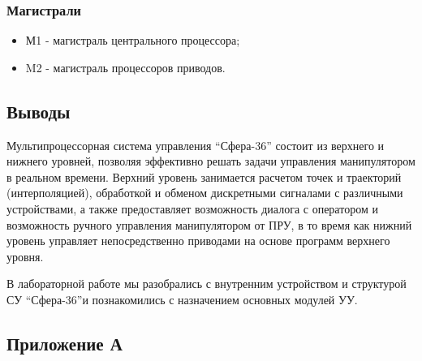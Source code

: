 \subsubsection*{Магистрали}

\begin{itemize}
    \item М1 - магистраль центрального процессора;
    \item M2 - магистраль процессоров приводов.

\end{itemize}

\subsection*{Выводы}

Мультипроцессорная система управления ``Сфера-36'' состоит из верхнего и нижнего уровней, позволяя эффективно решать задачи управления манипулятором в реальном времени. Верхний уровень занимается расчетом точек и траекторий (интерполяцией), обработкой и обменом дискретными сигналами с различными устройствами, а также предоставляет возможность диалога с оператором и возможность ручного управления манипулятором от ПРУ, в то время как нижний уровень управляет непосредственно приводами на основе программ верхнего уровня.

В лабораторной работе мы разобрались с внутренним устройством и структурой СУ ``Сфера-36''и познакомились с назначением основных модулей УУ.

\clearpage

\subsection*{Приложение А}

